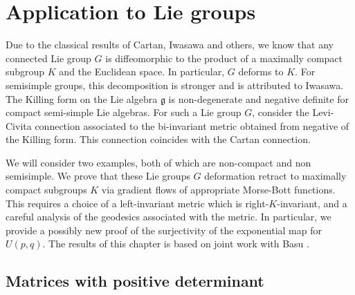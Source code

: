 \chapter{Application to Lie groups}\label{ch:ApplicationToLieGroups}
\minitoc
\hf Due to the classical results of Cartan, Iwasawa and others, we know that any connected Lie group  $G$ is diffeomorphic to the product of a maximally compact subgroup $K$ and the Euclidean space. In particular, $G$ deforms to $K$. For semisimple groups, this decomposition is stronger and is attributed to Iwasawa. The Killing form  on the Lie algebra  $\mathfrak{g}$ is non-degenerate and negative definite for compact semi-simple Lie algebras. For such a Lie group $G$, consider the Levi-Civita connection  associated to the bi-invariant metric obtained from negative of the Killing form. This connection coincides with the Cartan connection. 

\bigskip
\hf We will consider two examples, both of which are non-compact and non semisimple. We prove that these Lie groups $G$ deformation retract to maximally compact subgroups $K$ via gradient flows of appropriate Morse-Bott functions. This requires a choice of a left-invariant metric which is right-$K$-invariant, and a careful analysis of the geodesics associated with the metric. In particular, we provide a possibly new proof of the surjectivity of the exponential map for $U(p,q)$. The results of this chapter is based on joint work with Basu \cite[\S 4]{BaPr21}. 

\section{Matrices with positive determinant}\label{Sec: GLnSOn}

